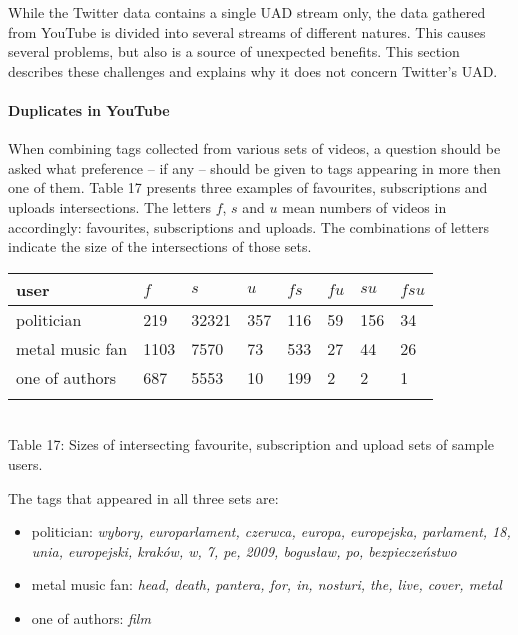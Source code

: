 While the Twitter data contains a single UAD stream only, the data gathered from
YouTube is divided into several streams of different natures. This causes
several problems, but also is a source of unexpected benefits. This section
describes these challenges and explains why it does not concern Twitter's UAD.

\paragraph{Duplicates in YouTube}

When combining tags collected from various sets of videos, a question should be
asked what preference -- if any -- should be given to tags appearing in more
then one of them. Table 17 presents three examples of favourites,
subscriptions and uploads intersections. The letters $f$, $s$ and $u$ mean
numbers of videos in accordingly: favourites, subscriptions and uploads. The
combinations of letters indicate the size of the intersections of those sets. \\

\begin{center}
\begin{tabular}{| l | l | l | l | l | l | l | l |}
user & $f$ & $s$ & $u$ & $fs$ & $fu$ & $su$ & $fsu$ \\ \hline
politician & 219 & 32321 & 357 & 116 & 59 & 156 & 34 \\
metal music fan & 1103 & 7570 & 73 & 533 & 27 & 44 & 26 \\
one of authors & 687 & 5553 & 10 & 199 & 2 & 2 & 1 \\
\label{intersections}
\end{tabular} \\
Table 17: Sizes of intersecting favourite, subscription and upload sets of sample users. \\
\end{center}

The tags that appeared in all three sets are:
\begin{itemize}
  \item{politician: \emph{wybory, europarlament, czerwca, europa, europejska,
  parlament, 18, unia, europejski, kraków, w, 7, pe, 2009, bogusław, po,
  bezpieczeństwo}}
  \item{metal music fan: \emph{head, death, pantera, for, in, nosturi, the, live, cover, metal}}
  \item{one of authors: \emph{film}}
\end{itemize}

